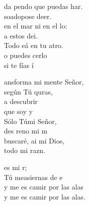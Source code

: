\documentclass[12pt]{article}
\begin{document}
\begin{multicols*}{2}
\begin{cancion}%
	da  pendo que puedas har.\\
	  soadopose deer.\\
	en el mar ni en el lo: \\
	a estos dei.\\
	Todo eá en tu atro.\\
	o puedes cerlo\\
	si te fías í\\
\end{cancion}%

\begin{cancion}%
	ansforma mi mente Señor,\\
	según Tú quras,\\
	a descubrir\\
	que soy y\\
	Sólo Túmi Señor,\\
	des reno mi m\\
	 buscaré, ai mi Dios,\\
	 todo mi razn.\\
\end{cancion}%

\begin{cancion}%
	 es mi r;  \\
	Tú measiernas de e\\
	y me es camir por las alas\\
	y me es camir por las alas.\\
\end{cancion}%


\end{multicols*}
\end{document}
